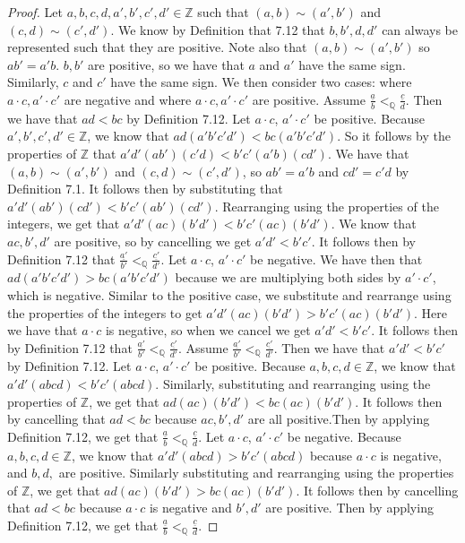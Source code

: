 \documentclass[12pt]{article}
\newcommand{\bbQ}{\mathbb{Q}}
\newcommand{\bbZ}{\mathbb{Z}}
\newcommand{\fr}[2]{\frac{\underline{#1}}{#2}}
\renewcommand{\_}[1]{\underline{ #1 }}
\theoremstyle{definition}
\numberwithin{equation}{subsection}
\begin{document}
\begin{proof}
Let $a,b,c,d,a',b',c',d' \in \bbZ$ such that $(a,b) \sim (a',b')$ and $(c,d) \sim (c',d')$. \newline
We know by Definition that 7.12 that $b,b',d,d'$ can always be represented such that they are positive. Note also that $(a,b) \sim (a',b')$ so $ab' = a'b$. $b,b'$ are positive, so we have that $a$ and $a'$ have the same sign. Similarly, $c$ and $c'$ have the same sign. We then consider two cases: where $a \cdot c, a' \cdot c'$ are negative and where $a\cdot c, a' \cdot c'$ are positive. \newline
Assume $\fr{a}{b} <_{\bbQ} \fr{c}{d}$. Then we have that $ad < bc$ by Definition 7.12. \newline
Let $a \cdot c$, $a' \cdot c'$ be positive. Because $a',b',c',d' \in \bbZ$, we know that $ad(a'b'c'd') < bc(a'b'c'd')$. So it follows by the properties of $\bbZ$ that $a'd'(ab')(c'd) < b'c'(a'b)(cd')$. We have that $(a,b) \sim (a',b')$ and $(c,d) \sim (c',d')$, so $ab' = a'b$ and $cd' = c'd$ by Definition 7.1. It follows then by substituting that $a'd'(ab')(cd') < b'c'(ab')(cd')$. Rearranging using the properties of the integers, we get that $a'd'(ac)(b'd') < b'c'(ac)(b'd')$. We know that $ac, b', d'$ are positive, so by cancelling we get $a'd' < b'c'$. It follows then by Definition 7.12 that $\fr{a'}{b'} <_{\bbQ} \fr{c'}{d'}$. \newline
Let $a \cdot c$, $a' \cdot c'$ be negative. We have then that $ad(a'b'c'd') > bc(a'b'c'd')$ because we are multiplying both sides by $a' \cdot c'$, which is negative. Similar to the positive case, we substitute and rearrange using the properties of the integers to get $a'd'(ac)(b'd') > b'c'(ac)(b'd')$. Here we have that $a \cdot c$ is negative, so when we cancel we get $a'd' < b'c'$. It follows then by Definition 7.12 that $\fr{a'}{b'} <_{\bbQ} \fr{c'}{d'}$.
Assume $\fr{a'}{b'} <_{\bbQ} \fr{c'}{d'}$. Then we have that $a'd' < b'c'$ by Definition 7.12. \newline
Let $a \cdot c$, $a' \cdot c'$ be positive. Because $a,b,c,d \in \bbZ$, we know that $a'd'(abcd) < b'c'(abcd)$. Similarly, substituting and rearranging using the properties of $\bbZ$, we get that $ad(ac)(b'd') < bc(ac)(b'd')$. It follows then by cancelling that $ad < bc$ because $ac, b', d'$ are all positive.Then by applying Definition 7.12, we get that $\fr{a}{b} <_{\bbQ} \fr{c}{d}$. \newline
Let $a \cdot c$, $a' \cdot c'$ be negative. Because $a,b,c,d \in \bbZ$, we know that $a'd'(abcd) > b'c'(abcd)$ because $a \cdot c$ is negative, and $b,d,$ are positive. Similarly substituting and rearranging using the properties of $\bbZ$, we get that $ad(ac)(b'd') > bc(ac)(b'd')$. It follows then by cancelling that $ad < bc$ because $a \cdot c$ is negative and $b',d'$ are positive. Then by applying Definition 7.12, we get that $\fr{a}{b} <_{\bbQ} \fr{c}{d}$.
\end{proof}
\end{document}
